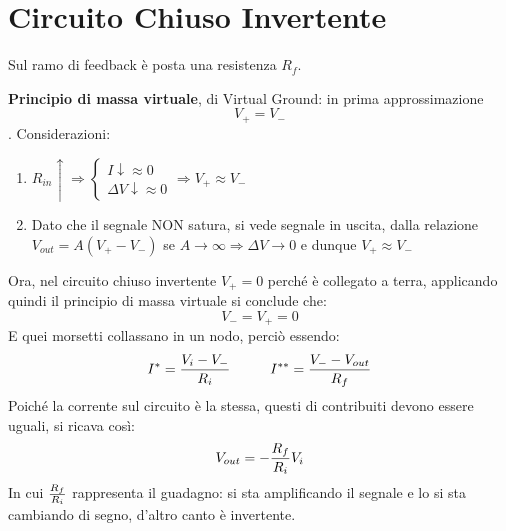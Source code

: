 \documentclass[a4paper, 15pt]{article}
\begin{document}
\section{Circuito Chiuso Invertente}
\begin{adjustwidth}{2in}{}	
   		Sul ramo di feedback è posta una resistenza $R_f$.   		
   		\begin{figure}[H]
   			\centering
   		\end{figure}   		
   		\textbf{Principio di massa virtuale}, di Virtual Ground: in prima approssimazione \[V_+ = V_-\].    		
   		Considerazioni:
   		\begin{enumerate}
   			\item \(R_{in}\uparrow \Rightarrow \begin{cases}
   				I\downarrow \approx 0\\
   				\Delta V\downarrow \approx 0
   			\end{cases} \Rightarrow V_+\approx V_-\)
   			\item Dato che il segnale NON satura, si vede segnale in uscita, dalla relazione \(V_{out} = A(V_+-V_-)\) se $A\rightarrow\infty \Rightarrow \Delta V\rightarrow0$ e dunque \(V_+\approx V_-\)
   		\end{enumerate}  	
   		Ora, nel circuito chiuso invertente $V_+=0$ perché è collegato a terra, applicando quindi il principio di massa virtuale si conclude che:
   		\[V_- = V_+ = 0\]
   		E quei morsetti collassano in un nodo, perciò essendo:
   		\[I^* = {V_i-V_-\over R_i} \hspace{1cm} I^{**} = {V_--V_{out}\over R_f} \]
   		Poiché la corrente sul circuito è la stessa, questi di contribuiti devono essere uguali, si ricava così: 
   		\[V_{out} = -{R_f\over R_i}V_i\]
   		In cui ${R_f\over R_i}$ rappresenta il guadagno: si sta amplificando il segnale e lo si sta cambiando di segno, d'altro canto è invertente. \newline 
   		

\end{adjustwidth}
\end{document}
